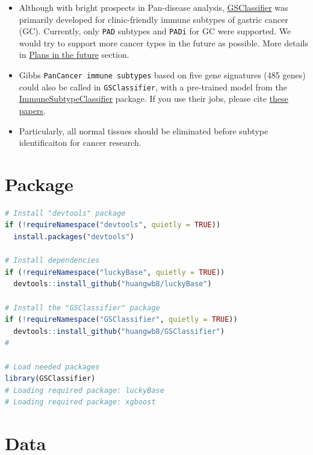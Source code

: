 \documentclass[
  12pt,
]{book}
\newcommand{\passthrough}[1]{#1}
\providecommand{\tightlist}{%
  \setlength{\itemsep}{0pt}\setlength{\parskip}{0pt}}
\begin{document}
\begin{itemize}
\tightlist
\item
  Although with bright prospects in Pan-disease analysis, \href{https://github.com/huangwb8/GSClassifier}{GSClassifier} was primarily developed for clinic-friendly immune subtypes of gastric cancer (GC). Currently, only \passthrough{\lstinline!PAD!} subtypes and \passthrough{\lstinline!PADi!} for GC were supported. We would try to support more cancer types in the future as possible. More details in \href{https://github.com/huangwb8/GSClassifier/wiki/Plans-in-the-future}{Plans in the future} section.
\item
  Gibbs\textquotesingle{} \passthrough{\lstinline!PanCancer immune subtypes!} based on five gene signatures (485 genes) could also be called in \passthrough{\lstinline!GSClassifier!}, with a pre-trained model from the \href{https://github.com/CRI-iAtlas/ImmuneSubtypeClassifier}{ImmuneSubtypeClassifier} package. If you use their jobs, please cite \href{https://github.com/huangwb8/GSClassifier/wiki/Introduction\#Reference}{these papers}.
\item
  Particularly, all normal tissues should be eliminated before subtype identificaiton for cancer research.
\end{itemize}

\hypertarget{package}{%
\section{Package}\label{package}}

\begin{lstlisting}[language=R]
# Install "devtools" package
if (!requireNamespace("devtools", quietly = TRUE))
  install.packages("devtools")

# Install dependencies
if (!requireNamespace("luckyBase", quietly = TRUE))
  devtools::install_github("huangwb8/luckyBase")

# Install the "GSClassifier" package
if (!requireNamespace("GSClassifier", quietly = TRUE))
  devtools::install_github("huangwb8/GSClassifier")
# 

# Load needed packages
library(GSClassifier)
# Loading required package: luckyBase
# Loading required package: xgboost
\end{lstlisting}

\hypertarget{data}{%
\section{Data}\label{data}}
\end{document}

